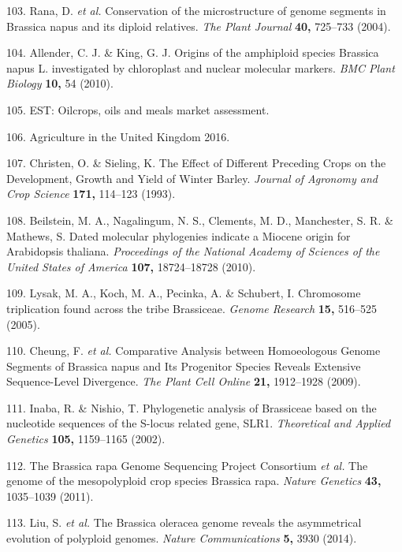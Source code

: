 \documentclass[12pt,]{book}
\begin{document}
\hypertarget{ref-rana_conservation_2004}{}
103. Rana, D. \emph{et al.} Conservation of the microstructure of genome
segments in Brassica napus and its diploid relatives. \emph{The Plant
Journal} \textbf{40,} 725--733 (2004).

\hypertarget{ref-allender_origins_2010}{}
104. Allender, C. J. \& King, G. J. Origins of the amphiploid species
Brassica napus L. investigated by chloroplast and nuclear molecular
markers. \emph{BMC Plant Biology} \textbf{10,} 54 (2010).

\hypertarget{ref-fao_2017}{}
105. EST: Oilcrops, oils and meals market assessment.

\hypertarget{ref-agriculture_uk_2017}{}
106. Agriculture in the United Kingdom 2016.

\hypertarget{ref-christen_effect_1993}{}
107. Christen, O. \& Sieling, K. The Effect of Different Preceding Crops
on the Development, Growth and Yield of Winter Barley. \emph{Journal of
Agronomy and Crop Science} \textbf{171,} 114--123 (1993).

\hypertarget{ref-beilstein_dated_2010}{}
108. Beilstein, M. A., Nagalingum, N. S., Clements, M. D., Manchester,
S. R. \& Mathews, S. Dated molecular phylogenies indicate a Miocene
origin for Arabidopsis thaliana. \emph{Proceedings of the National
Academy of Sciences of the United States of America} \textbf{107,}
18724--18728 (2010).

\hypertarget{ref-lysak_chromosome_2005}{}
109. Lysak, M. A., Koch, M. A., Pecinka, A. \& Schubert, I. Chromosome
triplication found across the tribe Brassiceae. \emph{Genome Research}
\textbf{15,} 516--525 (2005).

\hypertarget{ref-cheung_comparative_2009}{}
110. Cheung, F. \emph{et al.} Comparative Analysis between Homoeologous
Genome Segments of Brassica napus and Its Progenitor Species Reveals
Extensive Sequence-Level Divergence. \emph{The Plant Cell Online}
\textbf{21,} 1912--1928 (2009).

\hypertarget{ref-inaba_phylogenetic_2002}{}
111. Inaba, R. \& Nishio, T. Phylogenetic analysis of Brassiceae based
on the nucleotide sequences of the S-locus related gene, SLR1.
\emph{Theoretical and Applied Genetics} \textbf{105,} 1159--1165 (2002).

\hypertarget{ref-rapa_genome_2011}{}
112. The Brassica rapa Genome Sequencing Project Consortium \emph{et
al.} The genome of the mesopolyploid crop species Brassica rapa.
\emph{Nature Genetics} \textbf{43,} 1035--1039 (2011).

\hypertarget{ref-oleracea_genome_2014}{}
113. Liu, S. \emph{et al.} The Brassica oleracea genome reveals the
asymmetrical evolution of polyploid genomes. \emph{Nature
Communications} \textbf{5,} 3930 (2014).
\end{document}
